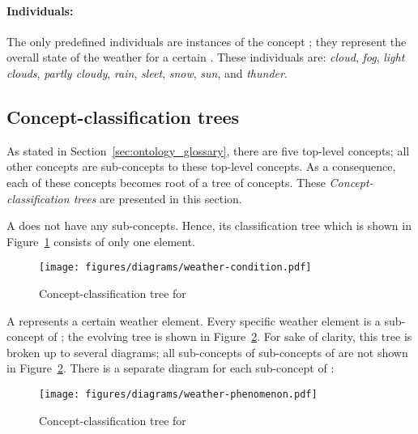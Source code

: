\paragraph{Individuals:}

The only predefined individuals are instances of the concept ; they represent the overall state of the weather for a certain . These individuals are: \emph{cloud}, \emph{fog}, \emph{light clouds}, \emph{partly cloudy}, \emph{rain}, \emph{sleet}, \emph{snow}, \emph{sun}, and \emph{thunder}.

\subsection{Concept-classification trees}
\label{sec:concept_classification_trees}

As stated in Section~\ref{sec:ontology_glossary}, there are five top-level concepts; all other concepts are sub-concepts to these top-level concepts. As a consequence, each of these concepts becomes root of a tree of concepts. These \emph{Concept-classification trees} are presented in this section.

A  does not have any sub-concepts. Hence, its classification tree which is shown in Figure~\ref{fig:tree_weather_condition} consists of only one element.

\begin{figure}
  \centering
  \texttt{[image: figures/diagrams/weather-condition.pdf]}
  \caption{Concept-classification tree for }
  \label{fig:tree_weather_condition}
\end{figure}

A  represents a certain weather element. Every specific weather element is a sub-concept of ; the evolving tree is shown in Figure~\ref{fig:tree_weather_phenomenon}. For sake of clarity, this tree is broken up to several diagrams; all sub-concepts of sub-concepts of  are not shown in Figure~\ref{fig:tree_weather_phenomenon}. There is a separate diagram for each sub-concept of :

\begin{figure}
  \centering
  \texttt{[image: figures/diagrams/weather-phenomenon.pdf]}
  \caption{Concept-classification tree for }
  \label{fig:tree_weather_phenomenon}
\end{figure}

